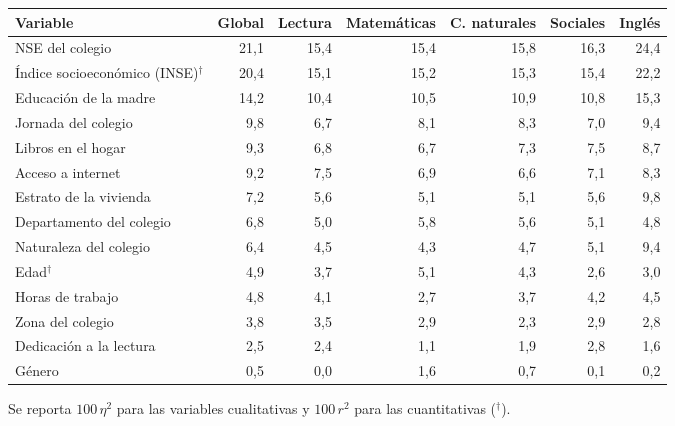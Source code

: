 \begingroup\tiny{}
\par
\noindent\begin{minipage}{\textwidth}
\centering
{}\label{tab:asociacion}
\begin{tabular}{l r r r r r r}
  \toprule
  \textbf{Variable} & \textbf{Global} & \textbf{Lectura} & \textbf{Matemáticas} & \textbf{C. naturales} & \textbf{Sociales} & \textbf{Inglés} \\
  \midrule

  NSE del colegio & 21,1 & 15,4 & 15,4 & 15,8 & 16,3 & 24,4 \\
  Índice socioeconómico (INSE)$^\dagger$ & 20,4 & 15,1 & 15,2 & 15,3 & 15,4 & 22,2 \\
  Educación de la madre & 14,2 & 10,4 & 10,5 & 10,9 & 10,8 & 15,3 \\
  Jornada del colegio & 9,8 & 6,7 & 8,1 & 8,3 & 7,0 & 9,4 \\
  Libros en el hogar & 9,3 & 6,8 & 6,7 & 7,3 & 7,5 & 8,7 \\
  Acceso a internet & 9,2 & 7,5 & 6,9 & 6,6 & 7,1 & 8,3 \\
  Estrato de la vivienda & 7,2 & 5,6 & 5,1 & 5,1 & 5,6 & 9,8 \\
  Departamento del colegio & 6,8 & 5,0 & 5,8 & 5,6 & 5,1 & 4,8 \\
  Naturaleza del colegio & 6,4 & 4,5 & 4,3 & 4,7 & 5,1 & 9,4 \\
  Edad$^\dagger$ & 4,9 & 3,7 & 5,1 & 4,3 & 2,6 & 3,0 \\
  Horas de trabajo & 4,8 & 4,1 & 2,7 & 3,7 & 4,2 & 4,5 \\
  Zona del colegio & 3,8 & 3,5 & 2,9 & 2,3 & 2,9 & 2,8 \\
  Dedicación a la lectura & 2,5 & 2,4 & 1,1 & 1,9 & 2,8 & 1,6 \\
  Género & 0,5 & 0,0 & 1,6 & 0,7 & 0,1 & 0,2 \\
  \bottomrule
\end{tabular}
\par\raggedright{\footnotesize Se reporta $100\,\eta^2$ para las variables cualitativas y $100\,r^2$ para las cuantitativas ($^\dagger$).\par}
\end{minipage}
\par
\endgroup
